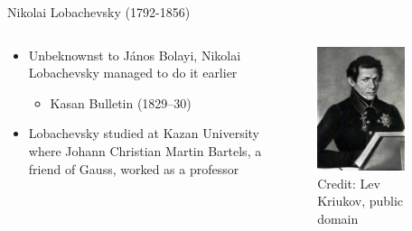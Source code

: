 \documentclass[utf8]{beamer}
\begin{document}
\begin{frame}{Nikolai Lobachevsky (1792-1856)}
\begin{columns}
\begin{column}{0.6\textwidth}
\begin{itemize}
\item Unbeknownst to J{\'a}nos Bolayi, Nikolai Lobachevsky managed to do it earlier
\begin{itemize}
\item Kasan Bulletin (1829–30)
\end{itemize}
\item Lobachevsky studied at Kazan University where Johann Christian Martin Bartels, a friend of Gauss, worked as a professor
\end{itemize}
\end{column}
\begin{column}{0.4\textwidth}
\begin{figure}
\centering
\includegraphics[width=0.8\textwidth]{images/lobachevsky.jpg}
\\
\tiny Credit: Lev Kriukov, public domain
\end{figure}
\end{column}
\end{columns}
\end{frame}
\end{document}
